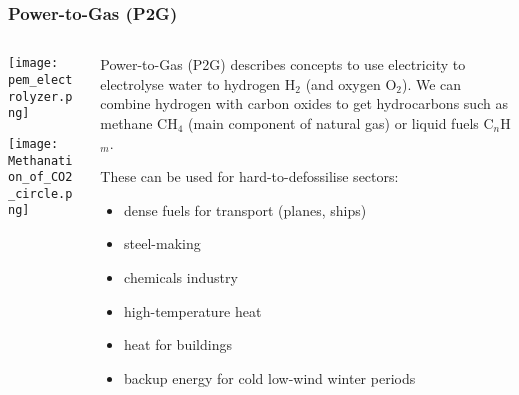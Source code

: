 \documentclass[10pt,dvipsnames]{beamer}
\let\olditem\item
\renewcommand{\item}{%
\olditem\vspace{5pt}}
\begin{document}
\begin{frame}
  \frametitle{Power-to-Gas (P2G)}

  \begin{columns}[T]
    \begin{column}{4cm}
      \texttt{[image: pem\_electrolyzer.png]}


      \vspace{.4cm}

      \texttt{[image: Methanation\_of\_CO2\_circle.png]}
    \end{column}
    \begin{column}{7cm}

      Power-to-Gas (P2G) describes concepts to use electricity to
      electrolyse water to \alert{hydrogen} H$_2$ (and oxygen O$_2$).
      We can combine hydrogen with carbon oxides to get
      \alert{hydrocarbons} such as methane CH$_4$ (main component of
      natural gas) or liquid fuels C$_n$H$_m$.

      These can be used for \alert{hard-to-defossilise sectors}:
            \begin{itemize}
            \item
              \alert{dense fuels} for transport (planes, ships)
            \item \alert{steel-making}
              \item \alert{chemicals industry}
              \item \alert{high-temperature heat}
              \item \alert{heat for buildings}
                \item \alert{backup energy} for cold low-wind winter periods
            \end{itemize}
    \end{column}
  \end{columns}

\end{frame}
\end{document}
